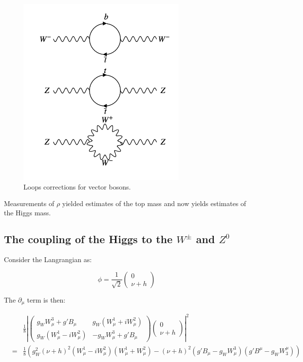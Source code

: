 \begin{figure}[!htb]
  \begin{center}
    \includegraphics[width=0.75\textwidth]{images/web_feynman/image_84.png}
    \caption[Loops corrections for vector bosons]{Loops corrections for vector bosons.}
    \label{fig:ch16_vectorBosonLoops}
  \end{center}
\end{figure}

Measurements of $\rho$ yielded estimates of the top mass and now yields estimates of the Higgs mass.

\subsection{The coupling of the Higgs to the \texorpdfstring{$W^{\pm}$}{Wpm} and \texorpdfstring{$Z^0$}{Z0}}

Consider the Langrangian as:

\[
  \phi = \frac{1}{\sqrt{2}}
  \left(
  \begin{array}{c}
    0 \\
    \nu + h
  \end{array}
  \right)
\]

The $\partial_{\mu}$ term is then:

\begin{eqnarray*}
  & &
  \frac{1}{8}\left|
  \left(
  \begin{array}{cc}
    g_W W_{\mu}^3 + g' B_{\mu} & g_W\left(W_{\mu}^1 + iW_{\mu}^2\right) \\
    g_W \left(W_{\mu}^1 - iW_{\mu}^2\right) & -g_W W_{\mu}^3 + g'B_{\mu}
  \end{array}
  \right)
  \left(
  \begin{array}{c}
    0 \\
    \nu + h
  \end{array}
  \right)
  \right|^2
  \\
  & = & \frac{1}{8}\left(g_W^2\left(\nu + h\right)^2\left(W_{\mu}^1 - iW_{\mu}^2\right)\left(W_{\mu}^1 + W_{\mu}^2\right) - \left(\nu + h\right)^2\left(g'B_{\mu} - g_W W_{\mu}^3\right)\left(g'B^{\mu} - g_W W^{\mu}_3\right)\right)
\end{eqnarray*}

